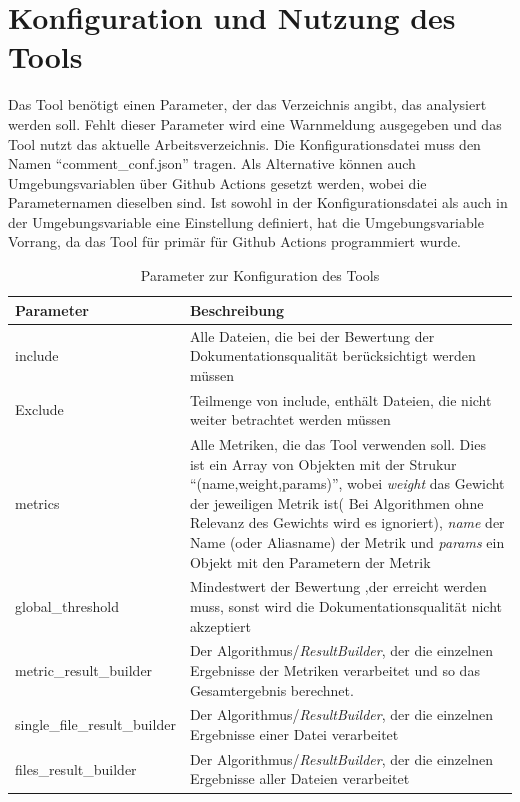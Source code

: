 \section{Konfiguration und Nutzung des Tools}
Das Tool benötigt einen Parameter, der das Verzeichnis angibt, das analysiert werden soll. Fehlt dieser Parameter wird eine Warnmeldung ausgegeben und das Tool nutzt das aktuelle Arbeitsverzeichnis. Die Konfigurationsdatei muss den Namen \enquote{comment\_conf.json} tragen. Als Alternative können auch Umgebungsvariablen über Github Actions gesetzt werden, wobei die Parameternamen dieselben sind. Ist sowohl in der Konfigurationsdatei als auch in der Umgebungsvariable eine Einstellung definiert, hat die Umgebungsvariable Vorrang, da das Tool für primär für Github Actions programmiert wurde.
\begin{table}[h]
    \centering
    \begin{tabular}{m{4cm}|m{11cm}}
    \hline
        Parameter & Beschreibung  \\
        \hline
        include & Alle Dateien, die bei der Bewertung der Dokumentationsqualität berücksichtigt werden müssen\\
        \hline
        Exclude & Teilmenge von include, enthält Dateien, die nicht weiter betrachtet werden müssen\\
        \hline
        metrics & Alle Metriken, die das Tool verwenden soll. Dies ist ein Array von Objekten mit der Strukur \enquote{(name,weight,params)}, wobei \textit{weight} das Gewicht der jeweiligen Metrik ist( Bei Algorithmen ohne Relevanz des Gewichts wird es ignoriert), \textit{name} der Name (oder Aliasname) der Metrik und \textit{params} ein Objekt mit den Parametern der Metrik\\\hline
        global\_threshold & Mindestwert der Bewertung ,der erreicht werden muss, sonst wird die Dokumentationsqualität nicht akzeptiert\\\hline
        metric\_result\_builder & Der Algorithmus/\textit{ResultBuilder}, der die einzelnen Ergebnisse der Metriken verarbeitet und so das Gesamtergebnis berechnet.\\\hline
          single\_file\_result\_builder & Der Algorithmus/\textit{ResultBuilder}, der die einzelnen Ergebnisse einer Datei verarbeitet\\\hline
        files\_result\_builder & Der Algorithmus/\textit{ResultBuilder}, der die einzelnen Ergebnisse aller Dateien verarbeitet
        
    \end{tabular}
    \caption{Parameter zur Konfiguration des Tools}
    \label{tab:tool_javadoc_conf}
\end{table}

